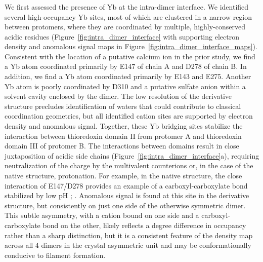 \subsubsection{\headingsubsubsectionfour}
% 
We first assessed the presence of Yb at the intra-dimer interface. We identified several high-occupancy Yb sites, most of which are clustered in a narrow region between protomers, where they are coordinated by multiple, highly-conserved acidic residues (Figure~\ref{fig:intra_dimer_interface} with supporting electron density and anomalous signal maps in Figure~\ref{fig:intra_dimer_interface_maps}). Consistent with the location of a putative calcium ion in the prior study, we find a Yb atom coordinated primarily by E147 of chain A and D278 of chain B. In addition, we find a Yb atom coordinated primarily by E143 and E275. Another Yb atom is poorly coordinated by D310 and a putative sulfate anion within a solvent cavity enclosed by the dimer. The low resolution of the derivative structure precludes identification of waters that could contribute to classical coordination geometries, but all identified cation sites are supported by electron density and anomalous signal. Together, these Yb bridging sites stabilize the interaction between thioredoxin domain II from protomer A and thioredoxin domain III of protomer B. The interactions between domains result in close juxtaposition of acidic side chains (Figure~\ref{fig:intra_dimer_interface}a), requiring neutralization of the charge by the multivalent counterions or, in the case of the native structure, protonation. For example, in the native structure, the close interaction of E147/D278 provides an example of a carboxyl-carboxylate bond stabilized by low pH \cite{Sawyer1982-sm}; \cite{Krause1991-le}. Anomalous signal is found at this site in the derivative structure, but consistently on just one side of the otherwise symmetric dimer. This subtle asymmetry, with a cation bound on one side and a carboxyl-carboxylate bond on the other, likely reflects a degree difference in occupancy rather than a sharp distinction, but it is a consistent feature of the density map across all 4 dimers in the crystal asymmetric unit and may be conformationally conducive to filament formation.

